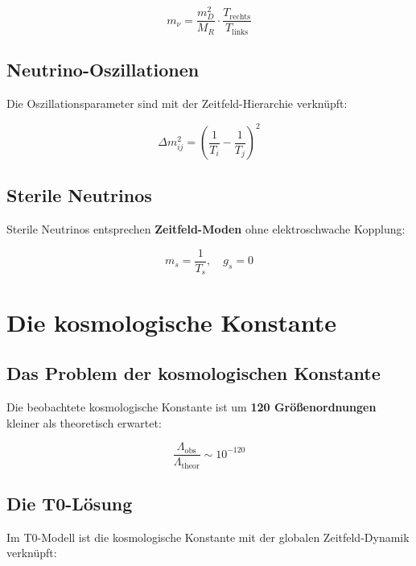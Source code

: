 \documentclass[12pt,a4paper]{report}
\begin{document}
	\begin{equation}
		m_\nu = \frac{m_D^2}{M_R} \cdot \frac{T_{\text{rechts}}}{T_{\text{links}}}
	\end{equation}
	
	\subsection{Neutrino-Oszillationen}
	
	Die Oszillationsparameter sind mit der Zeitfeld-Hierarchie verknüpft:
	
	\begin{equation}
		\Delta m_{ij}^2 = \left(\frac{1}{T_i} - \frac{1}{T_j}\right)^2
	\end{equation}
	
	\subsection{Sterile Neutrinos}
	
	Sterile Neutrinos entsprechen \textbf{Zeitfeld-Moden} ohne elektroschwache Kopplung:
	
	\begin{equation}
		m_s = \frac{1}{T_s}, \quad g_s = 0
	\end{equation}
	
	\section{Die kosmologische Konstante}
	
	\subsection{Das Problem der kosmologischen Konstante}
	
	Die beobachtete kosmologische Konstante ist um \textbf{120 Größenordnungen} kleiner als theoretisch erwartet:
	
	\begin{equation}
		\frac{\Lambda_{\text{obs}}}{\Lambda_{\text{theor}}} \sim 10^{-120}
	\end{equation}
	
	\subsection{Die T0-Lösung}
	
	Im T0-Modell ist die kosmologische Konstante mit der globalen Zeitfeld-Dynamik verknüpft:
	
\end{document}
